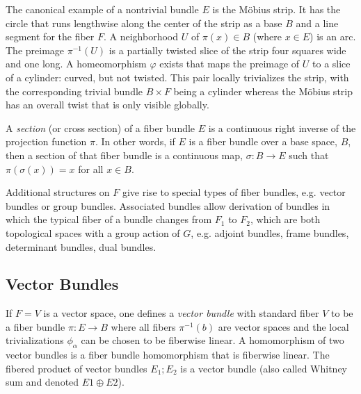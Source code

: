 \documentclass{article}
\theoremstyle{definition}
\begin{document}
    

    
    The canonical example of a nontrivial bundle $E$ is the Möbius strip. It has the circle that runs lengthwise along the center of the strip as a base $B$ and a line segment for the fiber $F$. A neighborhood $U$ of ${\displaystyle \pi (x)\in B}$ (where $x \in E$) is an arc. The preimage $\pi ^{-1}(U)$ is a partially twisted slice of the strip four squares wide and one long. A homeomorphism $\varphi$ exists that maps the preimage of $U$ to a slice of a cylinder: curved, but not twisted. This pair locally trivializes the strip, with the corresponding trivial bundle $\displaystyle B\times F$ being a cylinder whereas the Möbius strip has an overall twist that is only visible globally.

    A \textit{section} (or cross section) of a fiber bundle $E$ is a continuous right inverse of the projection function $\pi$. In other words, if $E$ is a fiber bundle over a base space, $B$, then a section of that fiber bundle is a continuous map, ${\displaystyle \sigma \colon B\to E}$ such that $\pi (\sigma (x))=x$ for all ${\displaystyle x\in B}$. 
    
    
    Additional structures on $F$ give rise to special types of fiber bundles, e.g. vector bundles or group bundles.  Associated bundles allow derivation of bundles in which the typical fiber of a bundle changes from $F_{1}$ to $F_{2}$, which are both topological spaces with a group action of $G$, e.g. adjoint bundles, frame bundles, determinant bundles, dual bundles. 

\subsection{Vector Bundles}

    If $F = V$ is a vector space, one defines a \textit{vector bundle} with standard fiber $V$ to be a fiber bundle $\pi : E \rightarrow B$ where all fibers $\pi^{-1} (b)$ are vector spaces and the local trivializations $\phi_\alpha$ can be chosen to be fiberwise linear. A homomorphism of two vector bundles is a fiber bundle homomorphism that is fiberwise linear. The fibered product of vector bundles $E_1; E_2$ is a vector bundle (also called Whitney sum and denoted $E1 \oplus E2$).
\end{document}
